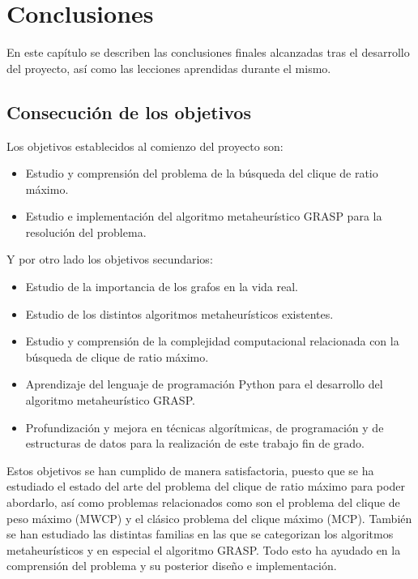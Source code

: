 
\chapter{Conclusiones} %

\label{Chapter6} %


En este capítulo se describen las conclusiones finales alcanzadas tras el desarrollo del proyecto, así como las lecciones aprendidas durante el mismo.

\section{Consecución de los objetivos}

Los objetivos establecidos al comienzo del proyecto son:

\begin{itemize}
	\item Estudio y comprensión del problema de la búsqueda del clique de ratio máximo.
	\item Estudio e implementación del algoritmo metaheurístico \gls{GRASP} para la resolución del problema.
\end{itemize}

Y por otro lado los objetivos secundarios:
\begin{itemize}
	\item Estudio de la importancia de los grafos en la vida real.
	\item Estudio de los distintos algoritmos metaheurísticos existentes.
	\item Estudio y comprensión de la complejidad computacional relacionada con la búsqueda de clique de ratio máximo.
	\item Aprendizaje del lenguaje de programación Python para el desarrollo del algoritmo metaheurístico \gls{GRASP}.
	\item Profundización y mejora en técnicas algorítmicas, de programación y de estructuras de datos para la realización de este trabajo fin de grado.
\end{itemize}

Estos objetivos se han cumplido de manera satisfactoria, puesto que se ha estudiado el estado del arte del problema del clique de ratio máximo para poder abordarlo, así como problemas relacionados como son el problema del clique de peso máximo (\gls{MWCP}) y el clásico problema del clique máximo (\gls{MCP}).
También se han estudiado las distintas familias en las que se categorizan los algoritmos metaheurísticos y en especial el algoritmo \gls{GRASP}.
Todo esto ha ayudado en la comprensión del problema y su posterior diseño e implementación.

